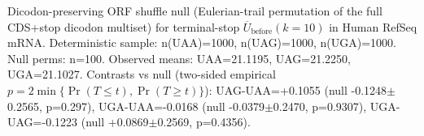 Dicodon-preserving ORF shuffle null (Eulerian-trail permutation of the full CDS+stop dicodon multiset) for terminal-stop $\overline{U}_{\mathrm{before}}(k=10)$ in Human RefSeq mRNA. Deterministic sample: n(UAA)=1000, n(UAG)=1000, n(UGA)=1000. Null perms: n=100.
 Observed means: UAA=21.1195, UAG=21.2250, UGA=21.1027.
 Contrasts vs null (two-sided empirical $p=2\min\{\Pr(T\le t),\Pr(T\ge t)\}$): UAG-UAA=+0.1055 (null -0.1248$\pm$0.2565, p=0.297), UGA-UAA=-0.0168 (null -0.0379$\pm$0.2470, p=0.9307), UGA-UAG=-0.1223 (null +0.0869$\pm$0.2569, p=0.4356).
